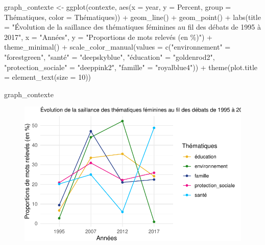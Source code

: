 \documentclass[
  letterpaper,
  DIV=11,
  numbers=noendperiod]{scrartcl}
\newenvironment{Shaded}{\begin{snugshade}}{\end{snugshade}}
\newcommand{\AttributeTok}[1]{\textcolor[rgb]{0.40,0.45,0.13}{#1}}
\newcommand{\DecValTok}[1]{\textcolor[rgb]{0.68,0.00,0.00}{#1}}
\newcommand{\FunctionTok}[1]{\textcolor[rgb]{0.28,0.35,0.67}{#1}}
\newcommand{\NormalTok}[1]{\textcolor[rgb]{0.00,0.23,0.31}{#1}}
\newcommand{\OtherTok}[1]{\textcolor[rgb]{0.00,0.23,0.31}{#1}}
\newcommand{\SpecialCharTok}[1]{\textcolor[rgb]{0.37,0.37,0.37}{#1}}
\newcommand{\StringTok}[1]{\textcolor[rgb]{0.13,0.47,0.30}{#1}}
\begin{document}
\begin{Shaded}
\begin{Highlighting}[]
\NormalTok{graph\_contexte }\OtherTok{\textless{}{-}} \FunctionTok{ggplot}\NormalTok{(contexte, }\FunctionTok{aes}\NormalTok{(}\AttributeTok{x =}\NormalTok{ year, }\AttributeTok{y =}\NormalTok{ Percent, }\AttributeTok{group =}\NormalTok{ Thématiques, }\AttributeTok{color =}\NormalTok{ Thématiques)) }\SpecialCharTok{+} \FunctionTok{geom\_line}\NormalTok{() }\SpecialCharTok{+} \FunctionTok{geom\_point}\NormalTok{() }\SpecialCharTok{+} \FunctionTok{labs}\NormalTok{(}\AttributeTok{title =} \StringTok{"Évolution de la saillance des thématiques féminines au fil des débats de 1995 à 2017"}\NormalTok{, }\AttributeTok{x =} \StringTok{"Années"}\NormalTok{, }\AttributeTok{y =} \StringTok{"Proportions de mots relevés (en \%)"}\NormalTok{) }\SpecialCharTok{+} \FunctionTok{theme\_minimal}\NormalTok{() }\SpecialCharTok{+} \FunctionTok{scale\_color\_manual}\NormalTok{(}\AttributeTok{values =} \FunctionTok{c}\NormalTok{(}\StringTok{"environnement"} \OtherTok{=} \StringTok{"forestgreen"}\NormalTok{, }\StringTok{"santé"} \OtherTok{=} \StringTok{"deepskyblue"}\NormalTok{, }\StringTok{"éducation"} \OtherTok{=} \StringTok{"goldenrod2"}\NormalTok{, }\StringTok{"protection\_sociale"} \OtherTok{=} \StringTok{"deeppink2"}\NormalTok{, }\StringTok{"famille"} \OtherTok{=} \StringTok{"royalblue4"}\NormalTok{)) }\SpecialCharTok{+} \FunctionTok{theme}\NormalTok{(}\AttributeTok{plot.title =} \FunctionTok{element\_text}\NormalTok{(}\AttributeTok{size =} \DecValTok{10}\NormalTok{))}

\NormalTok{ graph\_contexte}
\end{Highlighting}
\end{Shaded}

\begin{figure}[H]

{\centering \includegraphics{Travail-Session_files/figure-pdf/unnamed-chunk-2-10.pdf}

}

\end{figure}
\end{document}
